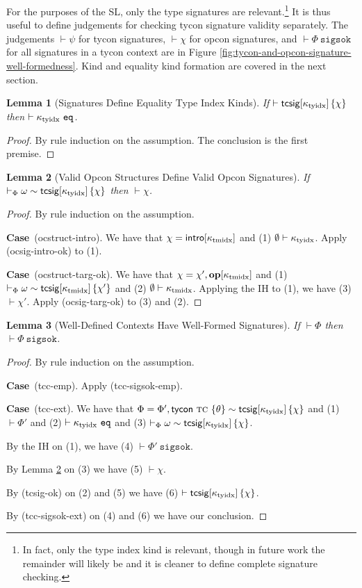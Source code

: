 \documentclass[12pt]{article}
\newtheorem{lemma}{Lemma}
\newcommand{\pfcase}[1]{\textbf{Case}~#1. }
\begin{document}
For the purposes of the SL, only the type signatures are relevant.\footnote{In fact, only the type index kind is relevant, though in future work the remainder will likely be and it is cleaner to define complete signature checking.} It is thus useful to define judgements for checking tycon signature validity separately. The judgements $\vdash \psi$ for tycon signatures, $\vdash \chi$ for opcon signatures, and $\vdash \Phi~\mathtt{sigsok}$ for all signatures in a tycon context are in Figure \ref{fig:tycon-and-opcon-signature-well-formedness}. Kind and equality kind formation are covered in the next section.

\begin{lemma}[Signatures Define Equality Type Index Kinds]
\label{lemma:sigs-define-eq-type-index-kinds}
If $\vdash {\sf tcsig}[\kappa_\text{tyidx}]\,\{\chi\}$ then $\vdash \kappa_\text{tyidx}~\mathtt{eq}$.
\end{lemma}
\begin{proof} By rule induction on the assumption. The conclusion is the first premise.
\end{proof}


\begin{lemma}[Valid Opcon Structures Define Valid Opcon Signatures]
\label{lemma:chi-ok}
If $\vdash_\Phi \omega \sim {\sf tcsig}[\kappa_\text{tyidx}]\,\{\chi\}$ then $\vdash \chi$.
\end{lemma}
\begin{proof} By rule induction on the assumption. 

\pfcase{(ocstruct-intro)} We have that $\chi={\sf intro}[\kappa_\text{tmidx}]$ and (1) $\emptyset \vdash \kappa_\text{tyidx}$. Apply (ocsig-intro-ok) to (1).

\pfcase{(ocstruct-targ-ok)} We have that $\chi=\chi', \textbf{op}[\kappa_\text{tmidx}]$ and (1) $\vdash_\Phi \omega \sim {\sf tcsig}[\kappa_\text{tmidx}]\,\{\chi'\}$ and (2) $\emptyset \vdash \kappa_\text{tmidx}$. Applying the IH to (1), we have (3) $\vdash \chi'$. Apply (ocsig-targ-ok) to (3) and (2). 
\end{proof}

\begin{lemma}[Well-Defined Contexts Have Well-Formed Signatures]
\label{lemma:well-defined-contexts-have-well-formed-signatures}
If $\vdash \Phi$ then $\vdash \Phi~\mathtt{sigsok}$.
\end{lemma}
\begin{proof} By rule induction on the assumption.

\pfcase{(tcc-emp)} Apply (tcc-sigsok-emp).

\pfcase{(tcc-ext)} We have that $\Phi=\Phi', {\sf tycon}~\textsc{tc} ~\{\theta\} \sim {\sf tcsig}[\kappa_\text{tyidx}]\,\{\chi\}$ and (1) $\vdash \Phi'$ and (2) $\vdash \kappa_\text{tyidx}~\mathtt{eq}$ and (3) $\vdash_\Phi \omega \sim {\sf tcsig}[\kappa_\text{tyidx}]\,\{\chi\}$. 

By the IH on (1), we have (4) $\vdash \Phi'~\mathtt{sigsok}$.

By Lemma \ref{lemma:chi-ok} on (3) we have (5) $\vdash \chi$.

By (tcsig-ok) on (2) and (5) we have (6) $\vdash {\sf tcsig}[\kappa_\text{tyidx}]\,\{\chi\}$.

By (tcc-sigsok-ext) on (4) and (6) we have our conclusion.
\end{proof}
\end{document}
